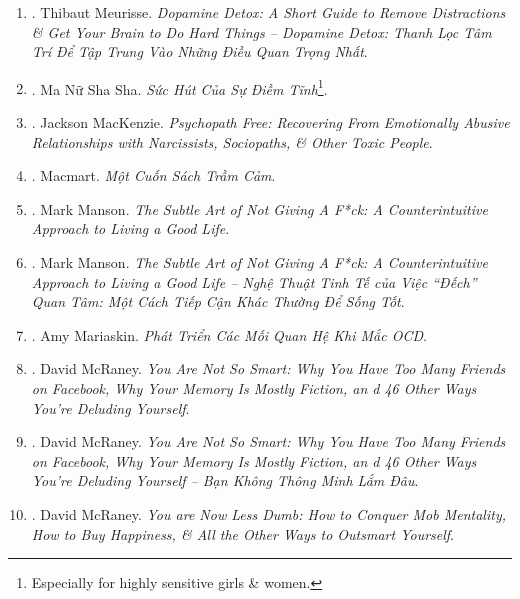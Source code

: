 \documentclass{article}
\begin{document}
\begin{enumerate}
	\item \cite{Meurisse_dopamine_VN}. {\sc Thibaut Meurisse}. {\it Dopamine Detox: A Short Guide to Remove Distractions \& Get Your Brain to Do Hard Things -- Dopamine Detox: Thanh Lọc Tâm Trí Để Tập Trung Vào Những Điều Quan Trọng Nhất}.\hfill{\sf[done]}
	
	\item \cite{MNSS_calm}. Ma Nữ Sha Sha. {\it Sức Hút Của Sự Điềm Tĩnh}\footnote{Especially for highly sensitive girls \& women.}.\hfill{\sf[done]}
	
	\item \cite{MacKenzie2015}. Jackson MacKenzie. {\it Psychopath Free: Recovering From Emotionally Abusive Relationships with Narcissists, Sociopaths, \& Other Toxic People}.\hfill{\sf[done]}
	\item \cite{Macmart_depress}. Macmart. {\it Một Cuốn Sách Trầm Cảm}.\hfill{\sf[reading]}
	
	\item \cite{Manson_giving_fuck}. Mark Manson. {\it The Subtle Art of Not Giving A F*ck: A Counterintuitive Approach to Living a Good Life}.\hfill{\sf[reading]}
	
	\item \cite{Manson_giving_fuck_vn}. Mark Manson. {\it The Subtle Art of Not Giving A F*ck: A Counterintuitive Approach to Living a Good Life -- Nghệ Thuật Tinh Tế của Việc ``Đếch'' Quan Tâm: Một Cách Tiếp Cận Khác Thường Để Sống Tốt}.\hfill{\sf[done]}
	
	\item \cite{Mariaskin_OCD}. Amy Mariaskin. {\it Phát Triển Các Mối Quan Hệ Khi Mắc OCD}.\hfill{\sf[done]}
	
	\item \cite{McRaney_not_smart}. {\sc David McRaney}. {\it You Are Not So Smart: Why You Have Too Many Friends on Facebook, Why Your Memory Is Mostly Fiction, an d 46 Other Ways You're Deluding Yourself}.
	
	\item \cite{McRaney_not_smart_VN}. {\sc David McRaney}. {\it You Are Not So Smart: Why You Have Too Many Friends on Facebook, Why Your Memory Is Mostly Fiction, an d 46 Other Ways You're Deluding Yourself -- Bạn Không Thông Minh Lắm Đâu}.\hfill{\sf[done]}
	
	\item \cite{McRaney_less_stupid}. {\sc David McRaney}. {\it You are Now Less Dumb: How to Conquer Mob Mentality, How to Buy Happiness, \& All the Other Ways to Outsmart Yourself}.
	

\end{enumerate}
\end{document}
